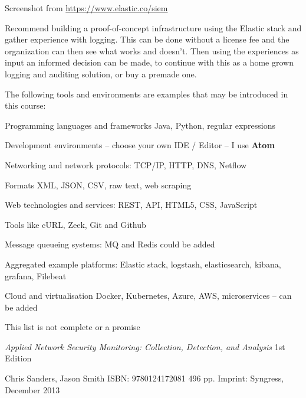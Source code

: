 \documentclass[Screen16to9,17pt]{foils}
\begin{document}
Screenshot from \url{https://www.elastic.co/siem}

Recommend building a proof-of-concept infrastructure using the Elastic stack and gather experience with logging. This can be done without a license fee and the organization can then see what works and doesn't. Then using the experiences as input an informed decision can be made, to continue with this as a home grown logging and auditing solution, or buy a premade one.



The following tools and environments are examples that may be introduced in this course:

\begin{list2}
\item Programming languages and frameworks Java, Python, regular expressions
\item Development environments -- choose your own IDE / Editor -- I use {\bf Atom}
\item Networking and network protocols: TCP/IP, HTTP, DNS, Netflow
\item Formats XML, JSON, CSV, raw text, web scraping
\item Web technologies and services: REST, API, HTML5, CSS, JavaScript
\item Tools like cURL, Zeek, Git and Github
\item Message queueing systems: MQ and Redis could be added
\item Aggregated example platforms: Elastic stack, logstash, elasticsearch, kibana, grafana, Filebeat
\item Cloud and virtualisation Docker, Kubernetes, Azure, AWS, microservices -- can be added
\end{list2}

\centerline{This list is not complete or a promise }



\emph{Applied Network Security Monitoring: Collection, Detection, and Analysis}
1st Edition

Chris Sanders, Jason Smith ISBN: 9780124172081 496 pp.
Imprint: Syngress, December 2013

{\footnotesize{}}
\end{document}
